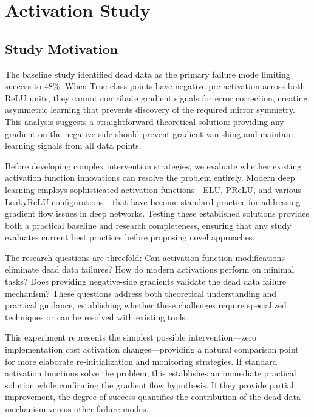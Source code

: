 \section{Activation Study}
\label{sec:relu1-activations}


\subsection*{Study Motivation}

The baseline study identified dead data as the primary failure mode limiting success to 48\%. When True class points have negative pre-activation across both ReLU units, they cannot contribute gradient signals for error correction, creating asymmetric learning that prevents discovery of the required mirror symmetry. This analysis suggests a straightforward theoretical solution: providing any gradient on the negative side should prevent gradient vanishing and maintain learning signals from all data points.

Before developing complex intervention strategies, we evaluate whether existing activation function innovations can resolve the problem entirely. Modern deep learning employs sophisticated activation functions—ELU, PReLU, and various LeakyReLU configurations—that have become standard practice for addressing gradient flow issues in deep networks. Testing these established solutions provides both a practical baseline and research completeness, ensuring that any study evaluates current best practices before proposing novel approaches.

The research questions are threefold: Can activation function modifications eliminate dead data failures? How do modern activations perform on minimal tasks? Does providing negative-side gradients validate the dead data failure mechanism? These questions address both theoretical understanding and practical guidance, establishing whether these challenges require specialized techniques or can be resolved with existing tools.

This experiment represents the simplest possible intervention—zero implementation cost activation changes—providing a natural comparison point for more elaborate re-initialization and monitoring strategies. If standard activation functions solve the problem, this establishes an immediate practical solution while confirming the gradient flow hypothesis. If they provide partial improvement, the degree of success quantifies the contribution of the dead data mechanism versus other failure modes.

